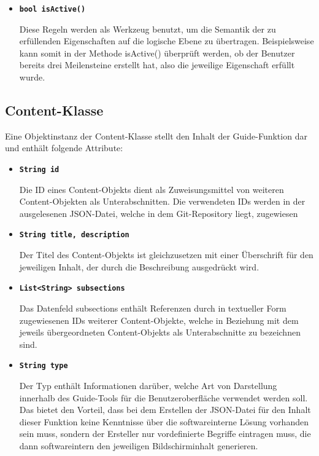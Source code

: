 \documentclass[bibliography=totoc,listof=totoc,BCOR=5mm,DIV=12,oneside]{scrbook}
\begin{document}
{\begin{itemize}
\item[] \texttt{\textbf{bool isActive()}}
\par Diese Regeln werden als Werkzeug benutzt, um die Semantik der zu erfüllenden Eigenschaften auf die logische Ebene zu übertragen.
Beispielsweise kann somit in der Methode isActive() überprüft werden, ob der Benutzer bereits drei Meilensteine erstellt hat, also die jeweilige Eigenschaft erfüllt wurde.

\end{itemize}

\subsection{Content-Klasse}
\par Eine Objektinstanz der Content-Klasse stellt den Inhalt der \grqq Guide\grqq -Funktion dar und enthält folgende Attribute:
\begin{itemize}

\item[] \texttt{\textbf{String id}}
\par Die ID eines Content-Objekts dient als Zuweisungsmittel von weiteren Content-Objekten als Unterabschnitten. Die verwendeten IDs werden in der ausgelesenen JSON-Datei, welche in dem Git-Repository liegt, zugewiesen

\item[] \texttt{\textbf{String title, description}}
\par Der Titel des Content-Objekts ist gleichzusetzen mit einer Überschrift für den jeweiligen Inhalt, der durch die Beschreibung ausgedrückt wird.

\item[] \texttt{\textbf{List<String> subsections}}
\par Das Datenfeld subsections enthält Referenzen durch in textueller Form zugewiesenen IDs weiterer Content-Objekte, welche in Beziehung mit dem jeweils übergeordneten Content-Objekts als Unterabschnitte zu bezeichnen sind.

\item[] \texttt{\textbf{String type}}
\par Der Typ enthält Informationen darüber, welche Art von Darstellung innerhalb des \grqq Guide\grqq -Tools für die Benutzeroberfläche verwendet werden soll. Das bietet den Vorteil, dass bei dem Erstellen der JSON-Datei für den Inhalt dieser Funktion keine Kenntnisse über die softwareinterne Lösung vorhanden sein muss, sondern der Ersteller nur vordefinierte Begriffe eintragen muss, die dann softwareintern den jeweiligen Bildschirminhalt generieren.
\end{itemize}

}
\end{document}
